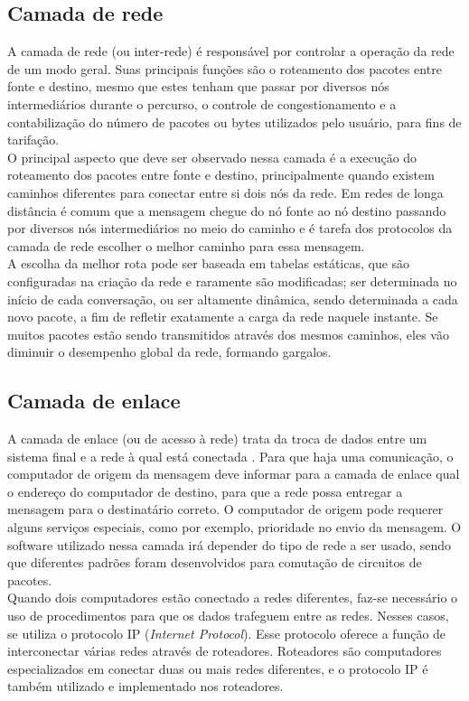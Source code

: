 \subsection{Camada de rede}
A camada de rede (ou inter-rede) é responsável por controlar a operação da rede 
de um modo geral. Suas principais funções são o roteamento dos pacotes entre 
fonte e destino, mesmo que estes tenham que passar por diversos nós 
intermediários durante o percurso, o controle de congestionamento e a 
contabilização do número de pacotes ou bytes utilizados pelo usuário, para fins 
de tarifação.\\
O principal aspecto que deve ser observado nessa camada é a execução do 
roteamento dos pacotes entre fonte e destino, principalmente quando existem 
caminhos diferentes para conectar entre si dois nós da rede. Em redes de longa 
distância é comum que a mensagem chegue do nó fonte ao nó destino passando por 
diversos nós intermediários no meio do caminho e é tarefa dos protocolos da 
camada de rede escolher o melhor caminho para essa mensagem.\\
A escolha da melhor rota pode ser baseada em tabelas estáticas, que são 
configuradas na criação da rede e raramente são modificadas; ser 
determinada no início de cada conversação, ou ser altamente dinâmica, sendo 
determinada a cada novo pacote, a fim de refletir exatamente a carga da rede 
naquele instante. Se muitos pacotes estão sendo transmitidos através dos mesmos 
caminhos, eles vão diminuir o desempenho global da rede, formando gargalos.\\
\subsection{Camada de enlace}
A camada de enlace (ou de acesso à rede) trata da troca de dados entre um 
sistema final e a rede à qual está conectada \cite{stallings2005}. Para que 
haja uma comunicação, o computador de origem da mensagem deve informar para a 
camada de enlace qual o endereço do computador de destino, para que a rede 
possa entregar a mensagem para o destinatário correto. O computador de origem 
pode requerer alguns serviços especiais, como por exemplo, prioridade no envio 
da mensagem. O software utilizado nessa camada irá depender do tipo de rede a 
ser usado, sendo que diferentes padrões foram desenvolvidos para comutação de 
circuitos de pacotes.\\
Quando dois computadores estão conectado a redes diferentes, faz-se necessário 
o uso de procedimentos para que os dados trafeguem entre as redes. Nesses 
casos, se utiliza o protocolo IP (\textit{Internet Protocol}). Esse protocolo 
oferece a função de interconectar várias redes através de roteadores. 
Roteadores são computadores especializados em conectar duas ou mais redes 
diferentes, e o protocolo IP é também utilizado e implementado nos roteadores.
